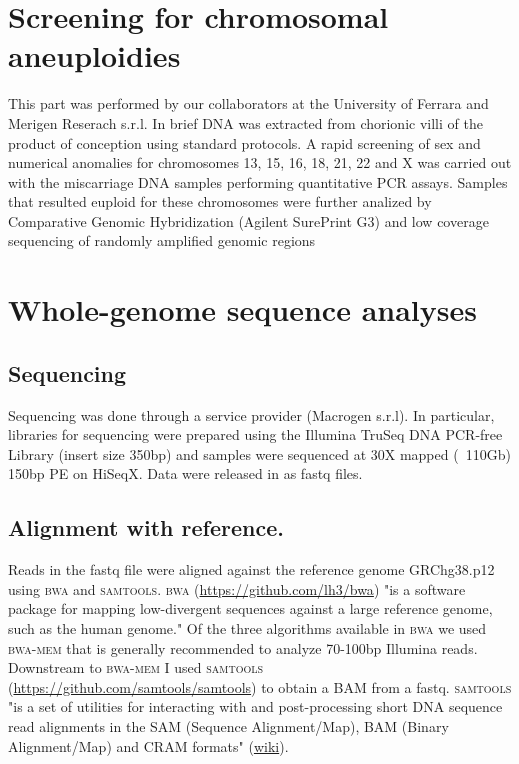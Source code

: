 \section{Screening for chromosomal aneuploidies}

This part was performed by our collaborators at the University of Ferrara and Merigen Reserach s.r.l. In brief DNA was extracted from chorionic villi of the product of conception using standard protocols. A rapid screening of sex and numerical anomalies for chromosomes 13, 15, 16, 18, 21, 22 and X was carried out with the miscarriage DNA samples performing quantitative PCR assays. Samples that resulted euploid for these chromosomes were further analized by Comparative Genomic Hybridization (Agilent SurePrint G3) and low coverage sequencing of randomly amplified genomic regions


\section {Whole-genome sequence analyses}

\subsection{Sequencing}
Sequencing was done through a service provider (Macrogen s.r.l). In particular, libraries for sequencing were prepared using the Illumina TruSeq DNA PCR-free Library (insert size 350bp) and samples were sequenced at 30X mapped (~110Gb) 150bp PE on HiSeqX. Data were released in as fastq files. 

\subsection{Alignment with reference.} Reads in the fastq file were aligned against the reference genome GRChg38.p12 \cite{rosenbloom2015ucsc} using \textsc{bwa} and \textsc{samtools}. \textsc{bwa} (\url{https://github.com/lh3/bwa}) "is a software package for mapping low-divergent sequences against a large reference genome, such as the human genome." Of the three algorithms available in \textsc{bwa} we used \textsc{bwa-mem}  that is generally recommended to analyze 70-100bp Illumina reads.\\

Downstream to \textsc{bwa-mem} I used \textsc{samtools} (\url{https://github.com/samtools/samtools}) to obtain a BAM from a fastq. \textsc{samtools} "is a set of utilities for interacting with and post-processing short DNA sequence read alignments in the SAM (Sequence Alignment/Map), BAM (Binary Alignment/Map) and CRAM formats" (\href{https://en.wikipedia.org/wiki/SAMtools}{wiki}). 

